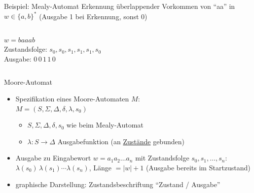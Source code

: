 \begin{frame}{Beispiel: Mealy-Automat}
	Erkennung überlappender Vorkommen von "`aa"' in $w \in \{a,b\}^*$ (Ausgabe 1 bei Erkennung, sonst 0)
	\begin{columns}
		\centering
		$w=baaab$\\
		Zustandsfolge: $s_0,s_0,s_1,s_1,s_1,s_0$\\
		Ausgabe: $0\,0\,1\,1\,0$
	\end{columns}
\end{frame}

\begin{frame}{Moore-Automat}
	\begin{itemize}
		\item Spezifikation eines Moore-Automaten $M$:\\
		$M=\left(S, \Sigma, \Delta, \delta, \lambda, s_0\right)$
		\begin{itemize}
			\item $S, \Sigma, \Delta, \delta, s_0$ wie beim Mealy-Automat
			\item $\lambda:S \rightarrow \Delta$ Ausgabefunktion (an \underline{Zustände} gebunden)
		\end{itemize}
		\item Ausgabe zu Eingabewort $w=a_1a_2\ldots a_n$ mit Zustandsfolge $s_0,s_1,\ldots,s_n$:\\
		\quad $\lambda(s_0)\,\lambda(s_1)\cdots\lambda(s_n)$, \quad Länge $=|w|+1$ (Ausgabe bereits im Startzustand)
		\item graphische Darstellung: Zustandsbeschriftung "`Zustand / Ausgabe"'
	\end{itemize}
\end{frame}

